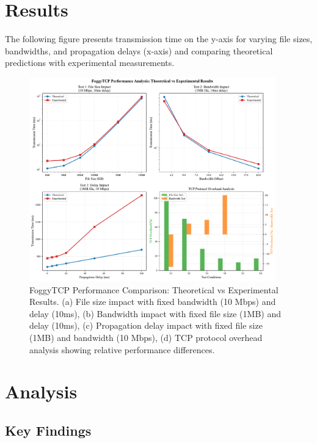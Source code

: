 \documentclass[11pt,letterpaper]{article}
\begin{document}
\section{Results}
The following figure presents transmission time on the y-axis
 for varying file sizes, bandwidths, and propagation delays (x-axis)
  and comparing theoretical predictions with experimental measurements.

\begin{figure}[H]
    \centering
    \includegraphics[width=0.95\textwidth]{foggytcp_performance_analysis.pdf}
    \caption{FoggyTCP Performance Comparison: Theoretical vs Experimental Results. 
    (a) File size impact with fixed bandwidth (10 Mbps) and delay (10ms), 
    (b) Bandwidth impact with fixed file size (1MB) and delay (10ms), 
    (c) Propagation delay impact with fixed file size (1MB) and bandwidth (10 Mbps), 
    (d) TCP protocol overhead analysis showing relative performance differences.}
    \label{fig:foggytcp_analysis}
\end{figure}
\section{Analysis}




\subsection{Key Findings}
\end{document}
